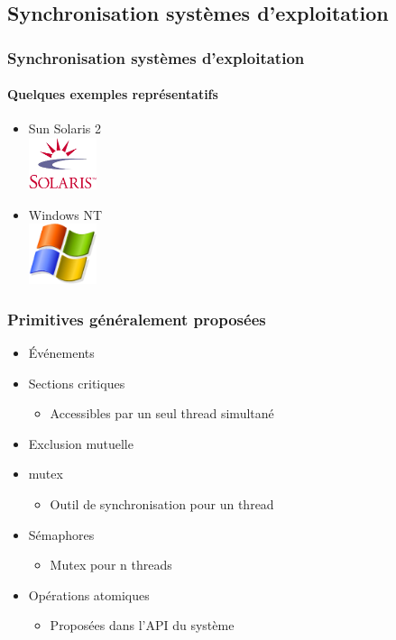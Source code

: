 \subsection{Synchronisation systèmes d’exploitation}

\begin{frame}
\frametitle{Synchronisation systèmes d’exploitation}
\framesubtitle{Quelques exemples représentatifs}

\begin{itemize}
\item Sun Solaris 2\\

\includegraphics[width=2cm]{../illustration/Logo_Solaris.png}
\item Windows NT\\

\includegraphics[width=2cm]{../illustration/logo_windows.png}
\end{itemize}
\end{frame}

\begin{frame}
\frametitle{Primitives généralement proposées}
\begin{itemize}
\item Événements
\item Sections critiques
\begin{itemize}
\item Accessibles par un seul thread simultané
\end{itemize}
\item Exclusion mutuelle
\item mutex
\begin{itemize}
\item Outil de synchronisation pour un thread
\end{itemize}
\item Sémaphores
\begin{itemize}
\item Mutex pour n threads
\end{itemize}
\item Opérations atomiques
\begin{itemize}
\item Proposées dans l'API du système
\end{itemize}
\end{itemize}
\end{frame}

